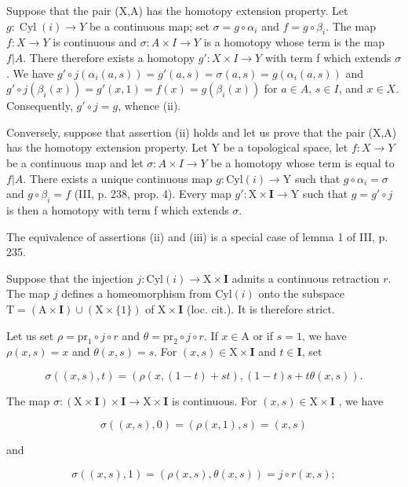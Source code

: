 Suppose that the pair (X,A) has the homotopy extension property. Let \(g:\operatorname{Cyl}(i)\to Y\) be a continuous map; set \(\sigma=g\circ\alpha_i\) and \(f=g\circ\beta_i\). The map \(f:X\to Y\) is continuous and \(\sigma:A\times I\to Y\) is a homotopy whose term is the map \(f|A\). There therefore exists a homotopy \(g':X\times I\to Y\) with term f which extends \(\sigma\). We have \(g'\circ j(\alpha_i(a,s))=g'(a,s)=\sigma(a,s)=g(\alpha_i(a,s))\) and \(g'\circ j(\beta_i(x))=g'(x,1)=f(x)=g(\beta_i(x))\) for \(a\in A\), \(s\in I\), and \(x\in X\). Consequently, \(g'\circ j=g\), whence (ii).

Conversely, suppose that assertion (ii) holds and let us prove that the pair (X,A) has the homotopy extension property. Let Y be a topological space, let \(f:X\to Y\) be a continuous map and let \(\sigma:A\times I\to Y\) be a homotopy whose term is equal to \(f|A\). There exists a unique continuous map \(g:\mathrm{Cyl}(i)\to\mathrm{Y}\) such that \(g\circ\alpha_i=\sigma\) and \(g\circ\beta_i=f\) (III, p. 238, prop. 4). Every map \(g':\mathrm{X}\times\mathbf{I}\to\mathrm{Y}\) such that \(g=g'\circ j\) is then a homotopy with term f which extends \(\sigma\).

  The equivalence of assertions (ii) and (iii) is a special case of lemma 1 of III, p. 235.

Suppose that the injection \(j\colon \mathrm{Cyl}(i)\to \mathrm{X}\times \mathbf{I}\) admits a continuous retraction \(r\). The map \(j\) defines a homeomorphism from \(\mathrm{Cyl}(i)\) onto the subspace \(\mathrm{T} = (\mathrm{A}\times \mathbf{I})\cup (\mathrm{X}\times \{1\})\) of \(\mathrm{X}\times \mathbf{I}\) (loc. cit.). It is therefore strict.

Let us set \(\rho = \mathrm{pr}_1\circ j\circ r\) and \(\theta = \mathrm{pr}_2\circ j\circ r\). If \(x\in \mathrm{A}\) or if \(s = 1\), we have \(\rho (x,s) = x\) and \(\theta (x,s) = s\). For \((x,s)\in \mathrm{X}\times \mathbf{I}\) and \(t\in \mathbf{I}\), set

\[
\sigma ((x, s), t) = (\rho (x, (1 - t) + s t), (1 - t) s + t \theta (x, s)).
\]

The map \(\sigma\colon(\mathrm{X}\times\mathbf{I})\times\mathbf{I}\to\mathrm{X}\times\mathbf{I}\) is continuous. For \((x,s)\in\mathrm{X}\times\mathbf{I}\) , we have

\[
\sigma ((x, s), 0) = (\rho (x, 1), s) = (x, s)
\]

and

\[
\sigma ((x, s), 1) = (\rho (x, s), \theta (x, s)) = j \circ r (x, s);
\]

